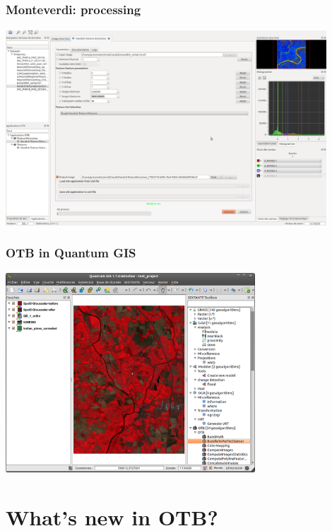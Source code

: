 \documentclass[8pt]{beamer}
\begin{document}
\begin{frame}
\frametitle{Monteverdi: processing}
\begin{minipage}[t][6cm][t]{\textwidth}
\begin{center}
\includegraphics[width=0.9\textwidth]{images/monteverdi2-haralick.png}
\end{center}
\end{minipage}
\end{frame}

\begin{frame}
\frametitle{OTB in Quantum GIS}
\begin{minipage}[t][6cm][t]{\textwidth}
\begin{center}
\includegraphics[width=0.7\textwidth]{images/otb_qgis.png}
\end{center}
\end{minipage}
\end{frame}

\section{What's new in OTB?}
\end{document}

